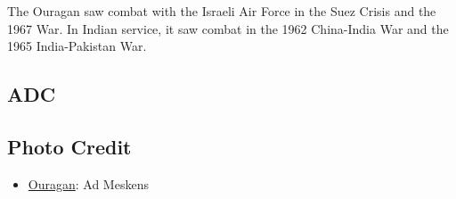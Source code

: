 The Ouragan saw combat with the Israeli Air Force in the Suez Crisis and the 1967 War. In Indian service, it saw combat in the 1962 China-India War and the 1965 India-Pakistan War.

\subsection{ADC}
\begin{adclist}
\end{adclist}

\subsection{Photo Credit}
\begin{itemize}\raggedright
    \item \href{https://commons.wikimedia.org/wiki/File:RMM_Brussel_Dassault_MD450_Ouragan_3.JPG}{Ouragan}: Ad Meskens
\end{itemize}